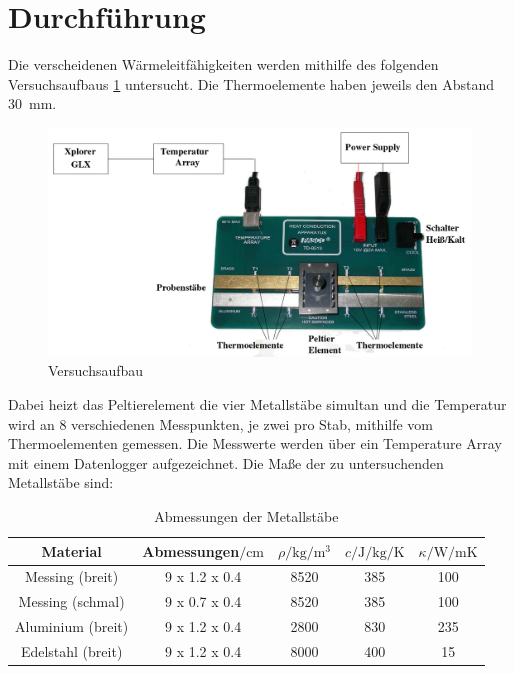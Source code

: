 \section{Durchführung}
\label{sec:Durchführung}
Die verscheidenen Wärmeleitfähigkeiten werden mithilfe des folgenden Versuchsaufbaus \ref{fig:aufbau}
untersucht. Die Thermoelemente haben jeweils den Abstand \SI{30}{\milli\meter}.
\begin{figure}
    \centering
    \includegraphics[width=\textwidth]{content/aufbau.png}
    \caption{Versuchsaufbau\cite{v204}}
    \label{fig:aufbau}
\end{figure}
Dabei heizt das Peltierelement die vier Metallstäbe simultan und die Temperatur wird an 8
verschiedenen Messpunkten, je zwei pro Stab, mithilfe vom Thermoelementen gemessen. Die
Messwerte werden über ein Temperature Array mit einem Datenlogger aufgezeichnet.
Die Maße der zu untersuchenden Metallstäbe sind:
\begin{table}
    \centering
    \caption{Abmessungen der Metallstäbe \cite{v204}}
    \label{tab:werte}
    \begin{tabular}{c c S S S}
        \toprule
        {Material} & {Abmessungen$/\si{\centi\meter}$} &{$\rho/\si{\kg\per\meter\cubed}$} &{$c/\si{\joule\per\kg\per\kelvin}$} &{$\kappa/\si{\watt\per\meter\kelvin}$} \\
        \midrule
        Messing (breit) & 9 x 1.2 x 0.4 & 8520 & 385 & 100 \\
        Messing (schmal) & 9 x 0.7 x 0.4 & 8520 & 385 & 100 \\
        Aluminium (breit) & 9 x 1.2 x 0.4 & 2800 & 830 & 235 \\
        Edelstahl (breit) & 9 x 1.2 x 0.4 & 8000 & 400 & 15 \\
        \bottomrule
    \end{tabular}
\end{table}
%
